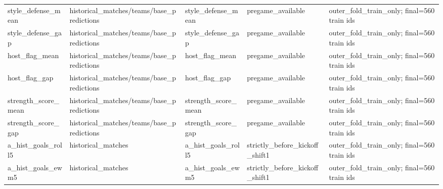 {\begin{longtable}{p{}p{}p{}p{}p{}}
style\_\allowbreak{}defense\_\allowbreak{}mean & historical\_\allowbreak{}matches/\allowbreak{}teams/\allowbreak{}base\_\allowbreak{}predictions & style\_\allowbreak{}defense\_\allowbreak{}mean & pregame\_\allowbreak{}available & outer\_\allowbreak{}fold\_\allowbreak{}train\_\allowbreak{}only;\allowbreak{} final=560 train ids \\
style\_\allowbreak{}defense\_\allowbreak{}gap & historical\_\allowbreak{}matches/\allowbreak{}teams/\allowbreak{}base\_\allowbreak{}predictions & style\_\allowbreak{}defense\_\allowbreak{}gap & pregame\_\allowbreak{}available & outer\_\allowbreak{}fold\_\allowbreak{}train\_\allowbreak{}only;\allowbreak{} final=560 train ids \\
host\_\allowbreak{}flag\_\allowbreak{}mean & historical\_\allowbreak{}matches/\allowbreak{}teams/\allowbreak{}base\_\allowbreak{}predictions & host\_\allowbreak{}flag\_\allowbreak{}mean & pregame\_\allowbreak{}available & outer\_\allowbreak{}fold\_\allowbreak{}train\_\allowbreak{}only;\allowbreak{} final=560 train ids \\
host\_\allowbreak{}flag\_\allowbreak{}gap & historical\_\allowbreak{}matches/\allowbreak{}teams/\allowbreak{}base\_\allowbreak{}predictions & host\_\allowbreak{}flag\_\allowbreak{}gap & pregame\_\allowbreak{}available & outer\_\allowbreak{}fold\_\allowbreak{}train\_\allowbreak{}only;\allowbreak{} final=560 train ids \\
strength\_\allowbreak{}score\_\allowbreak{}mean & historical\_\allowbreak{}matches/\allowbreak{}teams/\allowbreak{}base\_\allowbreak{}predictions & strength\_\allowbreak{}score\_\allowbreak{}mean & pregame\_\allowbreak{}available & outer\_\allowbreak{}fold\_\allowbreak{}train\_\allowbreak{}only;\allowbreak{} final=560 train ids \\
strength\_\allowbreak{}score\_\allowbreak{}gap & historical\_\allowbreak{}matches/\allowbreak{}teams/\allowbreak{}base\_\allowbreak{}predictions & strength\_\allowbreak{}score\_\allowbreak{}gap & pregame\_\allowbreak{}available & outer\_\allowbreak{}fold\_\allowbreak{}train\_\allowbreak{}only;\allowbreak{} final=560 train ids \\
a\_\allowbreak{}hist\_\allowbreak{}goals\_\allowbreak{}roll5 & historical\_\allowbreak{}matches & a\_\allowbreak{}hist\_\allowbreak{}goals\_\allowbreak{}roll5 & strictly\_\allowbreak{}before\_\allowbreak{}kickoff\_\allowbreak{}shift1 & outer\_\allowbreak{}fold\_\allowbreak{}train\_\allowbreak{}only;\allowbreak{} final=560 train ids \\
a\_\allowbreak{}hist\_\allowbreak{}goals\_\allowbreak{}ewm5 & historical\_\allowbreak{}matches & a\_\allowbreak{}hist\_\allowbreak{}goals\_\allowbreak{}ewm5 & strictly\_\allowbreak{}before\_\allowbreak{}kickoff\_\allowbreak{}shift1 & outer\_\allowbreak{}fold\_\allowbreak{}train\_\allowbreak{}only;\allowbreak{} final=560 train ids \\

\end{longtable}}
